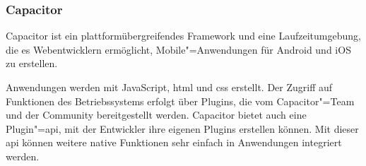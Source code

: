 \subsubsection{Capacitor}

Capacitor ist ein plattformübergreifendes Framework und eine Laufzeitumgebung, die es Webentwicklern ermöglicht, Mobile"=Anwendungen für Android und iOS zu erstellen.
\cite{capacitor}

Anwendungen werden mit JavaScript, \ac{html} und \ac{css} erstellt.
Der Zugriff auf Funktionen des Betriebssystems erfolgt über Plugins, die vom Capacitor"=Team und der Community bereitgestellt werden.
Capacitor bietet auch eine Plugin"=\acs{api}, mit der Entwickler ihre eigenen Plugins erstellen können.
Mit dieser \ac{api} können weitere native Funktionen sehr einfach in Anwendungen integriert werden.
\cite{capacitor:docs}

